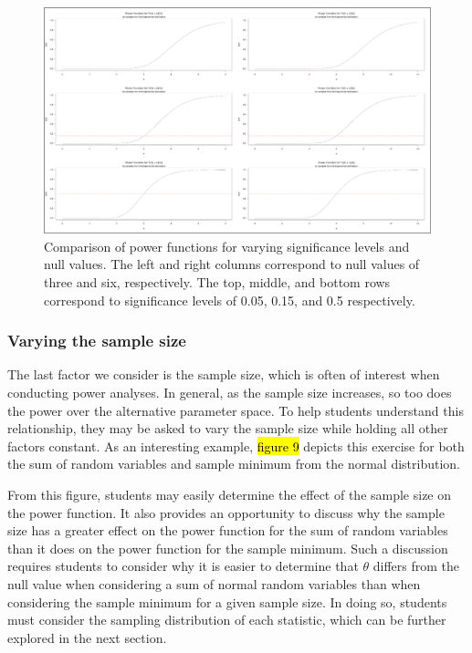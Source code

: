\documentclass{TISE}
\begin{document}
\begin{figure}[H]
	\centering
	\includegraphics[width=\linewidth]{varyingsig.png}
	\caption{Comparison of power functions for varying significance levels and null values. The left and right columns correspond to null values of three and six, respectively. The top, middle, and bottom rows correspond to significance levels of 0.05, 0.15, and 0.5 respectively.}
\end{figure}

\subsubsection{Varying the sample size}

The last factor we consider is the sample size, which is often of interest when conducting power analyses. In general, as the sample size increases, so too does the power over the alternative parameter space. To help students understand this relationship, they may be asked to vary the sample size while holding all other factors constant. As an interesting example, \hl{figure 9} depicts this exercise for both the sum of random variables and sample minimum from the normal distribution. 

From this figure, students may easily determine the effect of the sample size on the power function. It also provides an opportunity to discuss why the sample size has a greater effect on the power function for the sum of random variables than it does on the power function for the sample minimum. Such a discussion requires students to consider why it is easier to determine that $\theta$ differs from the null value when considering a sum of normal random variables than when considering the sample minimum for a given sample size. In doing so, students must consider the sampling distribution of each statistic, which can be further explored in the next section.
\end{document}
